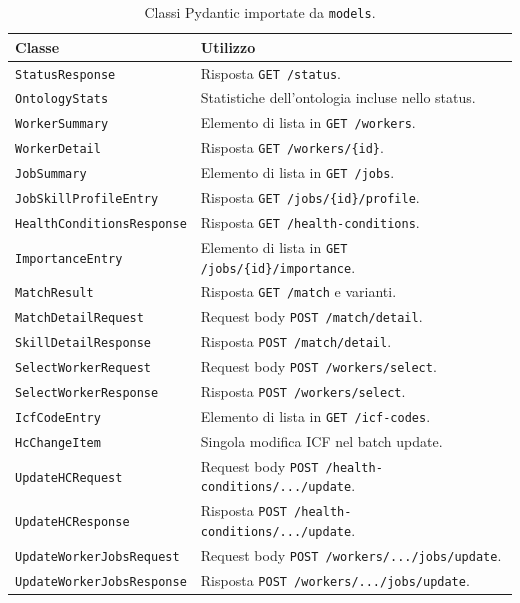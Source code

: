 \documentclass[a4paper,12pt]{article}
\begin{document}
\begin{table}[H]
\centering
\caption{Classi Pydantic importate da \texttt{models}.}
\label{tab:models-imports}
\begin{tabular}{L{5.5cm} L{7.5cm}}
\toprule
\textbf{Classe} & \textbf{Utilizzo} \\
\midrule
\texttt{StatusResponse} & Risposta \texttt{GET /status}. \\
\texttt{OntologyStats} & Statistiche dell'ontologia incluse nello status. \\
\texttt{WorkerSummary} & Elemento di lista in \texttt{GET /workers}. \\
\texttt{WorkerDetail} & Risposta \texttt{GET /workers/\{id\}}. \\
\texttt{JobSummary} & Elemento di lista in \texttt{GET /jobs}. \\
\texttt{JobSkillProfileEntry} & Risposta \texttt{GET /jobs/\{id\}/profile}. \\
\texttt{HealthConditionsResponse} & Risposta \texttt{GET /health-conditions}. \\
\texttt{ImportanceEntry} & Elemento di lista in \texttt{GET /jobs/\{id\}/importance}. \\
\texttt{MatchResult} & Risposta \texttt{GET /match} e varianti. \\
\texttt{MatchDetailRequest} & Request body \texttt{POST /match/detail}. \\
\texttt{SkillDetailResponse} & Risposta \texttt{POST /match/detail}. \\
\texttt{SelectWorkerRequest} & Request body \texttt{POST /workers/select}. \\
\texttt{SelectWorkerResponse} & Risposta \texttt{POST /workers/select}. \\
\texttt{IcfCodeEntry} & Elemento di lista in \texttt{GET /icf-codes}. \\
\texttt{HcChangeItem} & Singola modifica ICF nel batch update. \\
\texttt{UpdateHCRequest} & Request body \texttt{POST /health-conditions/.../update}. \\
\texttt{UpdateHCResponse} & Risposta \texttt{POST /health-conditions/.../update}. \\
\texttt{UpdateWorkerJobsRequest} & Request body \texttt{POST /workers/.../jobs/update}. \\
\texttt{UpdateWorkerJobsResponse} & Risposta \texttt{POST /workers/.../jobs/update}. \\
\bottomrule
\end{tabular}
\end{table}
\end{document}
